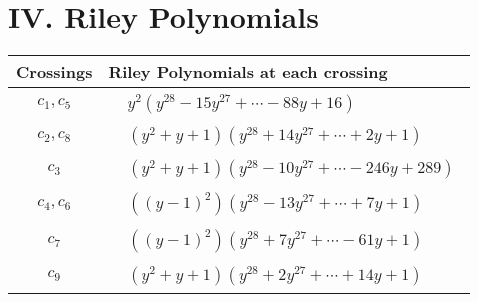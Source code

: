 \documentclass[1p]{elsarticle_modified}
\theoremstyle{definition}
\begin{document}
\centering \section*{ IV. Riley Polynomials}
\begin{tabular}{m{50pt}|m{274pt}}
Crossings & \hspace{64pt}Riley Polynomials at each crossing \\
\hline $$\begin{aligned}c_{1},c_{5}\end{aligned}$$&$\begin{aligned}
&y^2(y^{28}-15 y^{27}+\cdots-88 y+16)
\end{aligned}$\\
\hline $$\begin{aligned}c_{2},c_{8}\end{aligned}$$&$\begin{aligned}
&(y^2+y+1)(y^{28}+14 y^{27}+\cdots+2 y+1)
\end{aligned}$\\
\hline $$\begin{aligned}c_{3}\end{aligned}$$&$\begin{aligned}
&(y^2+y+1)(y^{28}-10 y^{27}+\cdots-246 y+289)
\end{aligned}$\\
\hline $$\begin{aligned}c_{4},c_{6}\end{aligned}$$&$\begin{aligned}
&((y-1)^2)(y^{28}-13 y^{27}+\cdots+7 y+1)
\end{aligned}$\\
\hline $$\begin{aligned}c_{7}\end{aligned}$$&$\begin{aligned}
&((y-1)^2)(y^{28}+7 y^{27}+\cdots-61 y+1)
\end{aligned}$\\
\hline $$\begin{aligned}c_{9}\end{aligned}$$&$\begin{aligned}
&(y^2+y+1)(y^{28}+2 y^{27}+\cdots+14 y+1)
\end{aligned}$\\
\hline
\end{tabular}
\vskip 2pc
\end{document}
